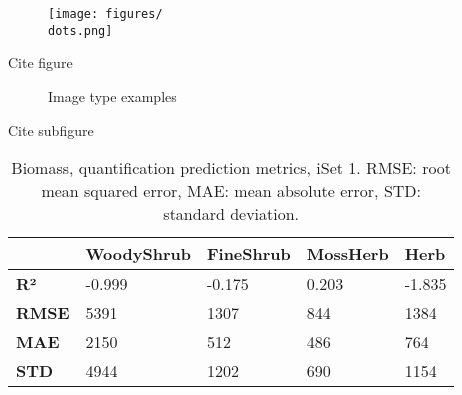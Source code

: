 
\begin{figure}[ht]
    \begin{center}
      \texttt{[image: figures/\\dots.png]} %
    \caption{\lipsum[3] %
             }
    \space\label{fig:Sample_Figure}
    \end{center}
\end{figure} 

Cite figure~

\begin{figure}[htbp]
  \centering

  \caption{Image type examples}
  \space\label{fig:Main_Figure_Caption}
\end{figure}%

Cite subfigure 


\begin{table}[ht]
  \captionsetup{justification=centering,margin=2cm, singlelinecheck=false, format=plain}
  \centering
  \begin{tabular}{@{}lllll@{}}
  \toprule
   & \textbf{WoodyShrub} & \textbf{FineShrub} & \textbf{MossHerb} & \textbf{Herb} \\ \midrule
  \textbf{R²}   & -0.999 & -0.175 & 0.203 & -1.835 \\
  \textbf{RMSE} & 5391   & 1307   & 844   & 1384   \\
  \textbf{MAE}  & 2150   & 512    & 486   & 764    \\
  \textbf{STD}  & 4944   & 1202   & 690   & 1154   \\ \bottomrule
  \end{tabular}
  \caption{Biomass, quantification prediction metrics, iSet 1.
          \newline
          RMSE: root mean squared error, MAE: mean absolute error, STD: standard deviation.
          }
  \space\label{tab:pred_metrics:met_iSet1_bm}
\end{table}



